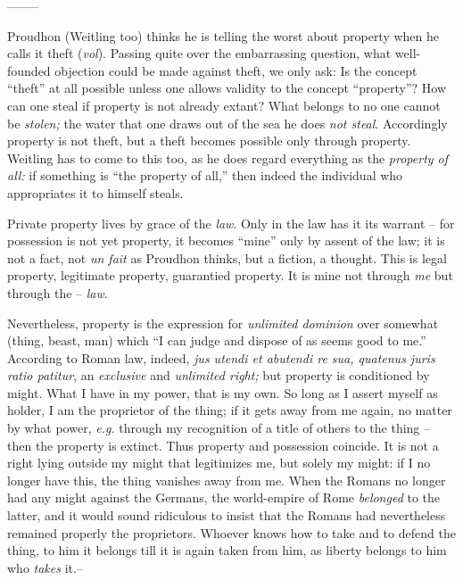 \documentclass[12pt,a4paper]{book}
\begin{document}
\begin{center}
--------\end{center}


Proudhon (Weitling too) thinks he is telling the worst about property when he 
calls it theft (\textit{vol}). Passing quite over the embarrassing question, 
what well-founded objection could be made against theft, we only ask: Is the 
concept ``theft'' at all possible unless one allows validity to the concept 
``property''? How can one steal if property is not already extant? What 
belongs to no one cannot be \textit{stolen;} the water that one draws out of 
the sea he does \textit{not steal}. Accordingly property is not theft, but a 
theft becomes possible only through property. Weitling has to come to this 
too, as he does regard everything as the \textit{property of all:} if 
something is ``the property of all,'' then indeed the individual who 
appropriates it to himself steals.

Private property lives by grace of the \textit{law}. Only in the law has it 
its warrant -- for possession is not yet property, it becomes ``mine'' only 
by assent of the law; it is not a fact, not \textit{un fait} as Proudhon 
thinks, but a fiction, a thought. This is legal property, legitimate property, 
guarantied property. It is mine not through \textit{me} but through the -- 
\textit{law}.

Nevertheless, property is the expression for \textit{unlimited dominion} over 
somewhat (thing, beast, man) which ``I can judge and dispose of as seems good 
to me.'' According to Roman law, indeed, \textit{jus utendi et abutendi re 
sua, quatenus juris ratio patitur}, an \textit{exclusive} and 
\textit{unlimited right;} but property is conditioned by might. What I have in 
my power, that is my own. So long as I assert myself as holder, I am the 
proprietor of the thing; if it gets away from me again, no matter by what 
power, \textit{e.g.} through my recognition of a title of others to the thing 
-- then the property is extinct. Thus property and possession coincide. It is 
not a right lying outside my might that legitimizes me, but solely my might: 
if I no longer have this, the thing vanishes away from me. When the Romans no 
longer had any might against the Germans, the world-empire of Rome 
\textit{belonged} to the latter, and it would sound ridiculous to insist that 
the Romans had nevertheless remained properly the proprietors. Whoever knows 
how to take and to defend the thing, to him it belongs till it is again taken 
from him, as liberty belongs to him who \textit{takes} it.--
\end{document}

